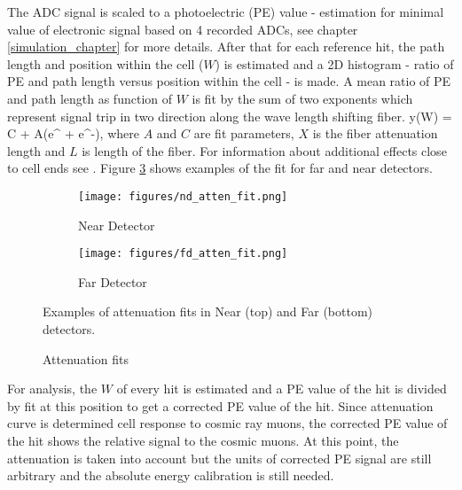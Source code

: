 The ADC signal is scaled to a photoelectric (PE) value - estimation for minimal value of electronic signal based on 4 recorded 
ADCs, see chapter \ref{simulation_chapter} for more details. After that for each reference hit, the path length 
and position within the cell ($W$) is estimated and a 2D histogram - ratio of PE and path length versus position 
within the cell - is made. A mean ratio of PE and path length as function of $W$ is fit by the sum of two exponents
which represent signal trip in two direction along the wave length shifting fiber.
\be
y(W) = C + A\Big(e^{} + e^{-}\Big),
\ee
where $A$ and $C$ are fit parameters, $X$ is the fiber attenuation length and $L$ is length of the fiber. For
information about additional effects close to cell ends see \cite{calib_technote}. Figure \ref{fig:att_fit} shows 
examples of the fit for far and near detectors.
\begin{figure}[t!]
\begin{subfigure}[t]{0.9\textwidth}
  \centering
  \texttt{[image: figures/nd\_atten\_fit.png]}
  \caption{Near Detector}
  \label{fig:att_fit_nd}
\end{subfigure}
\vspace{0.5cm}
\newline
\begin{subfigure}[t]{0.9\textwidth}
  \centering
  \texttt{[image: figures/fd\_atten\_fit.png]}
  \caption{Far Detector}
  \label{fig:att_fitt_fd}
\end{subfigure}
\caption{Attenuation fits}
{Examples of attenuation fits in Near (top) and Far (bottom) detectors.}
\label{fig:att_fit}
\end{figure}

For analysis, the $W$ of every hit is estimated and a PE value of the hit is divided by fit at this position to 
get a corrected PE value of the hit. Since attenuation curve is determined cell response to cosmic ray muons, the 
corrected PE value of the hit shows the relative signal to the cosmic muons. At this point, the attenuation is taken
into account but the units of corrected PE signal are still arbitrary and the absolute energy calibration is still 
needed. 

